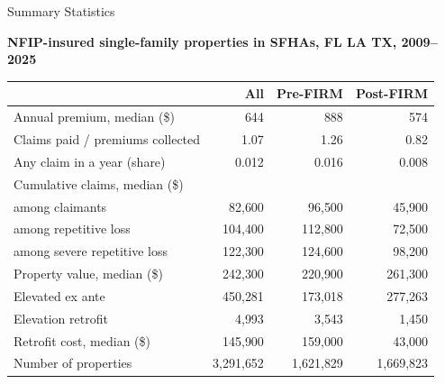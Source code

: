\documentclass[serif, aspectratio=169, 10pt]{beamer}
\begin{document}
\begin{frame}{Summary Statistics}
\vspace{-.5cm}
\begin{table}\centering\small
\textbf{NFIP-insured single-family properties in SFHAs, FL LA TX, 2009--2025}
\vspace{2mm}
\begin{tabular}{lrrr}
\toprule
 & All & Pre-FIRM & Post-FIRM \\
\midrule
\quad Annual premium, median (\$)            & 644       & 888       & 574       \\
\addlinespace
\quad Claims paid / premiums collected       & 1.07      & 1.26      & 0.82      \\
\quad Any claim in a year (share)            & 0.012     & 0.016     & 0.008     \\
\quad Cumulative claims, median (\$) \\
\quad\quad among claimants                   & 82{,}600  & 96{,}500  & 45{,}900  \\
\quad\quad among repetitive loss             & 104{,}400 & 112{,}800 & 72{,}500  \\
\quad\quad among severe repetitive loss      & 122{,}300 & 124{,}600 & 98{,}200  \\
\addlinespace
\quad Property value, median (\$)            & 242{,}300 & 220{,}900 & 261{,}300 \\
\addlinespace
\quad Elevated ex ante                       & 450{,}281 & 173{,}018 & 277{,}263 \\
\quad Elevation retrofit                     & 4{,}993   & 3{,}543   & 1{,}450   \\
\quad Retrofit cost, median (\$)             & 145{,}900 & 159{,}000 & 43{,}000  \\
\midrule
Number of properties                         & 3{,}291{,}652 & 1{,}621{,}829 & 1{,}669{,}823 \\
\bottomrule
\end{tabular}
\end{table}
\end{frame}
\end{document}
